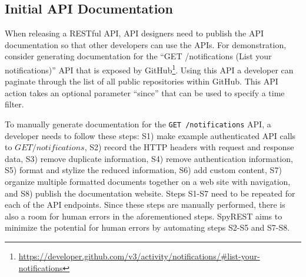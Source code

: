 \documentclass[conference]{IEEEtran}
\begin{document}
\subsection{Initial API Documentation} %
When releasing a RESTful API, API designers need to publish the API documentation so that other developers can use the APIs. For demonstration, consider generating documentation for the ``GET /notifications (List your notifications)'' API that is exposed by GitHub\footnote{\url{https://developer.github.com/v3/activity/notifications/#list-your-notifications}}. Using this API a developer can paginate through the list of all public repositories within GitHub. This API action takes an optional parameter ``since'' that can be used to specify a time filter.

To manually generate documentation for the \texttt{GET /notifications} API, a developer needs to follow these steps: S1) make example authenticated API calls to $GET /notifications$, S2) record the HTTP headers with request and response data, S3) remove duplicate information, S4) remove authentication information, S5) format and stylize the reduced information, S6) add custom content, S7) organize multiple formatted documents together on a web site with navigation, and S8) publish the documentation website. Steps S1-S7 need to be repeated for each of the API endpoints. Since these steps are manually performed, there is also a room for human errors in the aforementioned steps. SpyREST aims to minimize the potential for human errors by automating steps S2-S5 and S7-S8.
\end{document}
